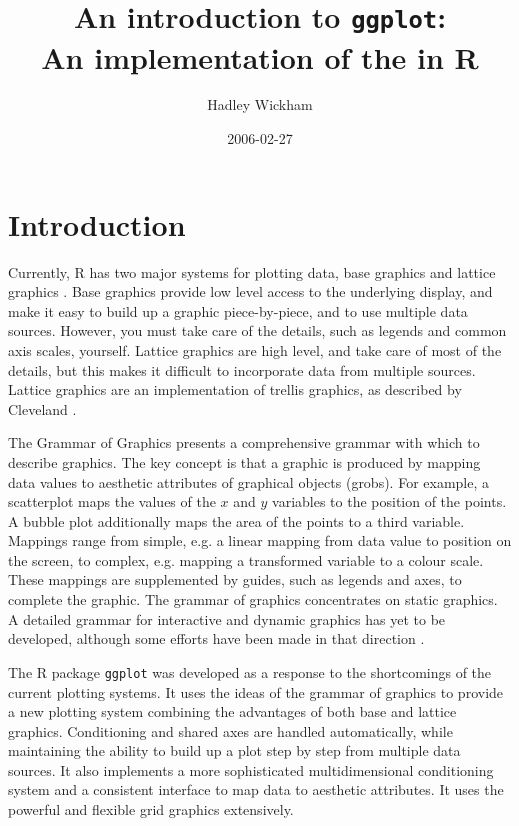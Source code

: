 \documentclass[]{article}
\title{
	An introduction to \texttt{ggplot}:\\
 	An implementation of the \GG in R
}
\author{Hadley Wickham}
\date{2006-02-27}
\def \GG {grammar of graphics }
\begin{document}

\maketitle

\section{Introduction}

Currently, R has two major systems for plotting data, base graphics and lattice graphics \cite{sarkar:2005}.  Base graphics provide low level access to the underlying display, and make it easy to build up a graphic piece-by-piece, and to use multiple data sources.  However, you must take care of the details, such as legends and common axis scales, yourself.  Lattice graphics are high level, and take care of most of the details, but this makes it difficult to incorporate data from multiple sources.  Lattice graphics are an implementation of trellis graphics, as described by Cleveland \cite{cleveland:1993,cleveland:1994}.

The Grammar of Graphics \cite{wilkinson:1999} presents a comprehensive grammar with which to describe graphics.  The key concept is that a graphic is produced by mapping data values to aesthetic attributes of graphical objects (grobs).  For example, a scatterplot maps the values of the $x$ and $y$ variables to the position of the points.  A bubble plot additionally maps the area of the points to a third variable.  Mappings range from simple, e.g. a linear mapping from data value to position on the screen, to complex, e.g. mapping a transformed variable to a colour scale.  These mappings are supplemented by guides, such as legends and axes, to complete the graphic.  The grammar of graphics concentrates on static graphics.  A detailed grammar for interactive and dynamic graphics has yet to be developed, although some efforts have been made in that direction \cite{wilhelm:2005}.

The R package \texttt{ggplot} was developed as a response to the shortcomings of the current plotting systems.  It uses the ideas of the \GG to provide a  new plotting system combining the advantages of both base and lattice graphics.  Conditioning and shared axes are handled automatically, while maintaining the ability to build up a plot step by step from multiple data sources.  It also implements a more sophisticated multidimensional conditioning system and a consistent interface to map data to aesthetic attributes.  It uses the powerful and flexible grid graphics \cite{murrell:2005} extensively.
\end{document}
